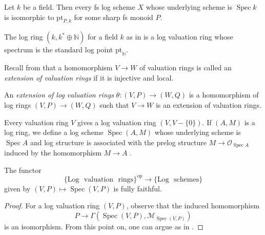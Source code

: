 \documentclass[10pt]{amsart}
\newcommand{\N}{\mathbb{N}}
\newcommand{\cM}{\mathcal{M}}
\DeclareMathOperator{\Spec}{Spec}
\newcommand{\pt}{\mathrm{pt}}
\begin{document}
\begin{example}
\label{exm:log point}
Let $k$ be a field.
Then every fs log scheme $X$ whose underlying scheme is $\Spec{k}$ is isomorphic to $\pt_{P,k}$ for some sharp fs monoid $P$.
\end{example}

\begin{example}
The log ring $(k,k^*\oplus \N)$ for a field $k$ as in \cite[Example III.1.5.2]{Ogu} 
is a log valuation ring whose spectrum is the standard log point $\pt_\N$.
\end{example}

Recall from \cite[Tag 0ASG]{stacks-project} that a homomorphism $V \to W$ of valuation rings is called an \emph{extension of valuation rings} if it is injective and local. 

\begin{definition}
An \emph{extension of log valuation rings} $\theta \colon (V,P) \to (W,Q)$ is a 
homomorphism of log rings $(V,P) \to (W,Q)$ such that $V \to W$ is an
extension of valuation rings.
\end{definition}

Every valuation ring \(V\) gives a log valuation ring \((V, V-\{0\}).\)
If \((A,M)\) is a log ring, we define a log scheme \(\Spec(A, M)\) whose underlying scheme is 
$\Spec{A}$ and log structure is associated with the prelog structure \(M \to \mathcal{O}_{\Spec{A}}\) 
induced by the homomorphism $M \to A$ \cite[Definition III.1.2.3]{Ogu}. 

\begin{proposition}
The functor
\[\{
\mathrm{Log}
\text{ }
\mathrm{valuation}
\text{ }
\mathrm{rings}\}^\mathrm{op}
\longrightarrow
\{
\mathrm{Log}
\text{ }
\mathrm{schemes}
\}\]
given by $(V,P)\mapsto \Spec{(V,P)}$ is fully faithful.
\end{proposition}
\begin{proof}
For a log valuation ring $(V,P)$,
observe that the induced homomorphism
\[
P\to \Gamma(\Spec{(V,P)},\cM_{\Spec{(V,P)}})
\]
is an isomorphism.
From this point on, one can argue as in \cite[Proposition 7.7]{BLPO}.
\end{proof}
\end{document}
